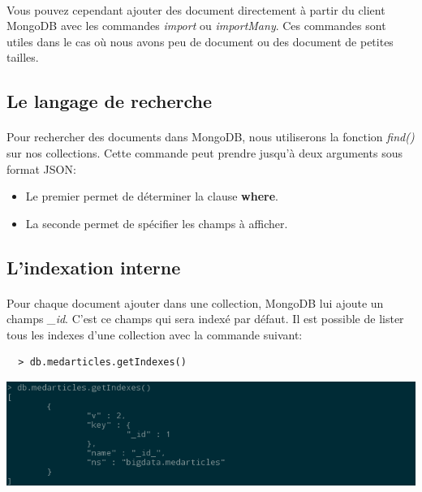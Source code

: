 \documentclass{article}
\begin{document}
  \paragraph{} Vous pouvez cependant ajouter des document directement à partir
  du client MongoDB avec les commandes \emph{import} ou \emph{importMany}.
  Ces commandes sont utiles dans le cas où nous avons peu de document ou des
  document de petites tailles.
  
\subsection{Le langage de recherche}
  \paragraph{} Pour rechercher des documents dans MongoDB, nous utiliserons la 
  fonction \emph{find()} sur nos collections. Cette commande peut prendre jusqu'à
  deux arguments sous format JSON:
  \begin{itemize}
    \item Le premier permet de déterminer la clause \textbf{where}.
    \item La seconde permet de spécifier les champs à afficher.
  \end{itemize} 
\subsection{L’indexation interne}
  \paragraph{} Pour chaque document ajouter dans une collection, MongoDB lui ajoute
  un champs \emph{\_id}. C'est ce champs qui sera indexé par défaut. Il est 
  possible de lister tous les indexes d'une collection avec la commande suivant:
  \begin{lstlisting}
  > db.medarticles.getIndexes()
  \end{lstlisting}
  \includegraphics[scale=0.8]{mongodb/getindexes.png}\\
  
\end{document}
